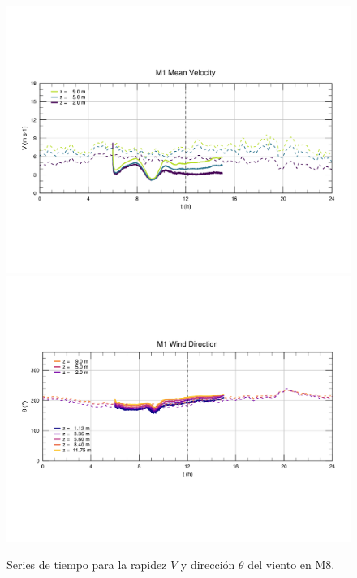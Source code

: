 \begin{figure}[H]
	\centering
	\includegraphics[width=0.87\linewidth,page=8,trim={9mm 57mm 10mm 60mm},clip]{Imagenes/06/bol/ts_interpol_compare.pdf}\\%
	\includegraphics[width=0.87\linewidth,page=8,trim={12mm 52mm 10mm 60mm},clip]{Imagenes/06/bol/ts_interpol_compare_o.pdf}%
	\vspace{-2mm}\caption{Series de tiempo para la rapidez $V$ y dirección $\theta$ del viento en M8.}
	\label{fig:06_bol_ts_m8}
\end{figure}

